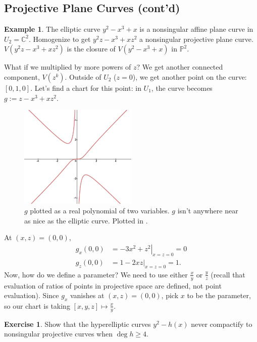\documentclass[12pt]{article}
\newcommand{\cx}{\mathbb{C}}
\newcommand{\p}{\mathbb{P}}
\theoremstyle{definition}
\newtheorem{example}[theorem]{Example}
\newtheorem{exercise}{Exercise}
\theoremstyle{remark}
\begin{document}
\subsection{Projective Plane Curves (cont'd)}
\begin{example}
    The elliptic curve $y^2-x^3+x$ is a nonsingular affine plane curve in $U_2=\cx^2$. Homogenize to get $y^2z-x^3+xz^2$ a nonsingular projective plane curve. $V(y^2z-x^3+xz^2)$ is the closure of $V(y^2-x^3+x)$ in $\p^2$.
    
    What if we multiplied by more powers of $z$? We get another connected component, $V(z^k)$. Outside of $U_2$ ($z=0$), we get another point on the curve: $[0,1,0]$. Let's find a chart for this point: in $U_1$, the curve becomes $g:=z-x^3+xz^2$.
    \begin{figure}[H]
        \centering
        \includegraphics[width=0.5\textwidth]{10.png}
        \caption{$g$ plotted as a real polynomial of two variables. $g$ isn't anywhere near as nice as the elliptic curve. Plotted in \cite{Desmos}.}
        \label{fig:Fig10}
    \end{figure}
    At $(x,z)=(0,0)$,
    \begin{equation}
        \begin{split}
            g_x(0,0)&=\left.-3x^2+z^2\right|_{x=z=0}=0\\
            g_z(0,0)&=\left.1-2xz\right|_{x=z=0}=1.
        \end{split}
    \end{equation}
    Now, how do we define a parameter? We need to use either $\frac{x}{y}$ or $\frac{y}{z}$ (recall that evaluation of ratios of points in projective space are defined, not point evaluation). Since $g_x$ vanishes at $(x,z)=(0,0)$, pick $x$ to be the parameter, so our chart is taking $[x,y,z]\mapsto\frac{x}{y}$.
\end{example}
\begin{exercise}
    Show that the hyperelliptic curves $y^2-h(x)$ never compactify to nonsingular projective curves when $\deg h\geq4$.
\end{exercise}
\end{document}
